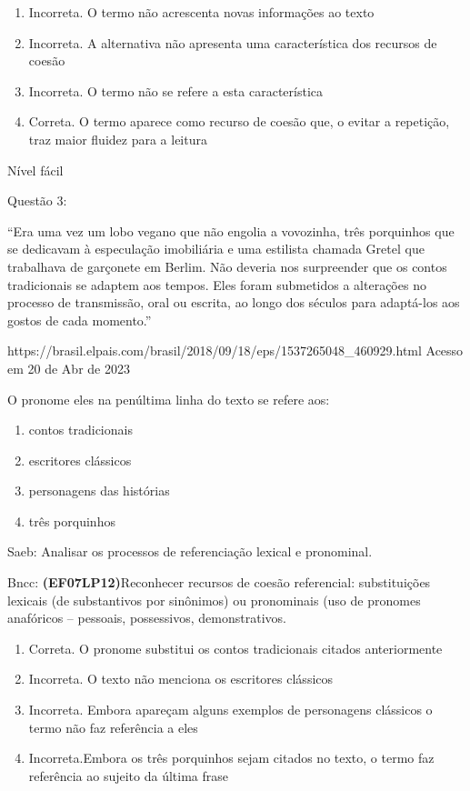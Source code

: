 {\begin{enumerate}
\def\labelenumi{\arabic{enumi}.}
\item
  Incorreta. O termo não acrescenta novas informações ao texto
\item
  Incorreta. A alternativa não apresenta uma característica dos recursos
  de coesão
\item
  Incorreta. O termo não se refere a esta característica
\item
  Correta. O termo aparece como recurso de coesão que, o evitar a
  repetição, traz maior fluidez para a leitura
\end{enumerate}

Nível fácil

Questão 3:

``Era uma vez um lobo vegano que não engolia a vovozinha, três
porquinhos que se dedicavam à especulação imobiliária e uma estilista
chamada Gretel que trabalhava de garçonete em Berlim. Não deveria nos
surpreender que os contos tradicionais se adaptem aos tempos. Eles foram
submetidos a alterações no processo de transmissão, oral ou escrita, ao
longo dos séculos para adaptá-los aos gostos de cada momento.''

https://brasil.elpais.com/brasil/2018/09/18/eps/1537265048\_460929.html
Acesso em 20 de Abr de 2023

O pronome eles na penúltima linha do texto se refere aos:

\begin{enumerate}
\def\labelenumi{\alph{enumi})}
\item
  contos tradicionais
\item
  escritores clássicos
\item
  personagens das histórias
\item
  três porquinhos
\end{enumerate}

Saeb: Analisar os processos de referenciação lexical e pronominal.

Bncc: \textbf{(EF07LP12)}Reconhecer recursos de coesão referencial:
substituições lexicais (de substantivos por sinônimos) ou pronominais
(uso de pronomes anafóricos -- pessoais, possessivos, demonstrativos.

\begin{enumerate}
\def\labelenumi{\arabic{enumi}.}
\item
  Correta. O pronome substitui os contos tradicionais citados
  anteriormente
\item
  Incorreta. O texto não menciona os escritores clássicos
\item
  Incorreta. Embora apareçam alguns exemplos de personagens clássicos o
  termo não faz referência a eles
\item
  Incorreta.Embora os três porquinhos sejam citados no texto, o termo
  faz referência ao sujeito da última frase
\end{enumerate}

}
